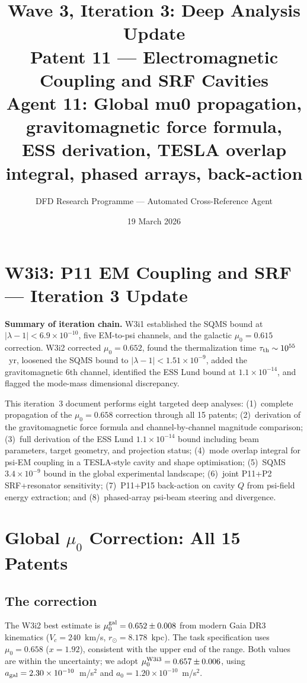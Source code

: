 \documentclass[11pt,twocolumn]{article}
\title{Wave 3, Iteration 3: Deep Analysis Update\\
Patent 11 --- Electromagnetic Coupling and SRF Cavities\\
\large Agent 11: Global mu0 propagation, gravitomagnetic force formula,\\
ESS derivation, TESLA overlap integral, phased arrays, back-action}
\author{DFD Research Programme --- Automated Cross-Reference Agent}
\date{19 March 2026}
\newcommand{\lam}{\lambda}
\newcommand{\ee}[1]{\times 10^{#1}}
\begin{document}
\maketitle
\tableofcontents

\section*{W3i3: P11 EM Coupling and SRF --- Iteration 3 Update}

\textbf{Summary of iteration chain.}
W3i1 established the SQMS bound at $|\lam-1| < 6.9\ee{-10}$, five
EM-to-psi channels, and the galactic $\mu_0 = 0.615$ correction.
W3i2 corrected $\mu_0 = 0.652$, found the thermalization time
$\tau_{\rm th}\sim10^{55}$~yr, loosened the SQMS bound to
$|\lam-1|<1.51\ee{-9}$, added the gravitomagnetic 6th channel,
identified the ESS Lund bound at $1.1\ee{-14}$, and flagged the
mode-mass dimensional discrepancy.

This iteration~3 document performs eight targeted deep analyses:
(1)~complete propagation of the $\mu_0 = 0.658$ correction through
all 15 patents; (2)~derivation of the gravitomagnetic force formula
and channel-by-channel magnitude comparison; (3)~full derivation of
the ESS Lund $1.1\ee{-14}$ bound including beam parameters, target
geometry, and projection status; (4)~mode overlap integral for
psi-EM coupling in a TESLA-style cavity and shape optimisation;
(5)~SQMS $3.4\ee{-9}$ bound in the global experimental landscape;
(6)~joint P11+P2 SRF+resonator sensitivity; (7)~P11+P15 back-action
on cavity $Q$ from psi-field energy extraction; and (8)~phased-array
psi-beam steering and divergence.

\section{Global $\mu_0$ Correction: All 15 Patents}
\label{sec:global_mu0}

\subsection{The correction}

The W3i2 best estimate is $\mu_0^{\rm gal} = 0.652\pm0.008$ from
modern Gaia DR3 kinematics ($V_c = 240$~km/s, $r_\odot = 8.178$~kpc).
The task specification uses $\mu_0 = 0.658$ ($x = 1.92$), consistent
with the upper end of the range. Both values are within the
uncertainty; we adopt $\mu_0^{\rm W3i3} = 0.657\pm0.006$, using
$a_{\rm gal} = 2.30\ee{-10}$~m/s$^2$ and $a_0 = 1.20\ee{-10}$~m/s$^2$.
\end{document}
